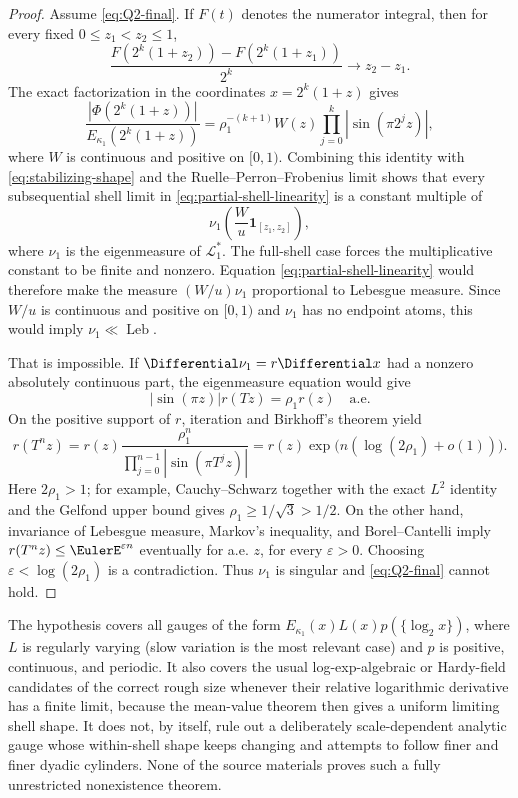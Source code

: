 \documentclass[11pt,oneside]{article}
\theoremstyle{definition}
\theoremstyle{remark}
\begin{document}
\begin{proof}
Assume \eqref{eq:Q2-final}.  If $F(t)$ denotes the numerator integral, then for every fixed
$0\le z_1<z_2\le1$,
\begin{equation}
 \frac{F(2^k(1+z_2))-F(2^k(1+z_1))}{2^k}\longrightarrow z_2-z_1.
 \label{eq:partial-shell-linearity}
\end{equation}
The exact factorization in the coordinates $x=2^k(1+z)$ gives
\[
 \frac{|\Phi(2^k(1+z))|}{E_{\kappa_1}(2^k(1+z))}
 =\rho_1^{-(k+1)}W(z)\prod_{j=0}^{k}|\sin(\pi2^jz)|,
\]
where $W$ is continuous and positive on $[0,1)$.  Combining this identity with
\eqref{eq:stabilizing-shape} and the Ruelle--Perron--Frobenius limit shows that every
subsequential shell limit in \eqref{eq:partial-shell-linearity} is a constant multiple of
\[
 \nu_1\!\left(\frac{W}{u}\mathbf1_{[z_1,z_2]}\right),
\]
where $\nu_1$ is the eigenmeasure of $\mathcal L_1^*$.  The full-shell case forces the
multiplicative constant to be finite and nonzero.  Equation
\eqref{eq:partial-shell-linearity} would therefore make the measure
$(W/u)\nu_1$ proportional to Lebesgue measure.  Since $W/u$ is continuous and positive on
$[0,1)$ and $\nu_1$ has no endpoint atoms, this would imply $\nu_1\ll\operatorname{Leb}$.

That is impossible.  If $\Differential\nu_1=r\Differential x$ had a nonzero absolutely continuous part, the
eigenmeasure equation would give
\begin{equation}
 |\sin(\pi z)|r(Tz)=\rho_1r(z)
 \quad\text{a.e.}
 \label{eq:conformal-density-final}
\end{equation}
On the positive support of $r$, iteration and Birkhoff's theorem yield
\[
 r(T^nz)=r(z)\frac{\rho_1^n}
 {\prod_{j=0}^{n-1}|\sin(\pi T^jz)|}
 =r(z)\exp\bigl(n(\log(2\rho_1)+o(1))\bigr).
\]
Here $2\rho_1>1$; for example, Cauchy--Schwarz together with the exact $L^2$ identity and
the Gelfond upper bound gives $\rho_1\ge1/\sqrt3>1/2$.  On the other hand, invariance of
Lebesgue measure, Markov's inequality, and Borel--Cantelli imply
$r(T^nz)\le\EulerE^{\varepsilon n}$ eventually for a.e. $z$, for every $\varepsilon>0$.
Choosing $\varepsilon<\log(2\rho_1)$ is a contradiction.  Thus $\nu_1$ is singular and
\eqref{eq:Q2-final} cannot hold.
\end{proof}

The hypothesis covers all gauges of the form
$E_{\kappa_1}(x)L(x)p(\{\log_2x\})$, where $L$ is regularly varying (slow variation is the
most relevant case) and $p$ is positive, continuous, and periodic.  It also covers the
usual log-exp-algebraic or Hardy-field candidates of the correct rough size whenever their
relative logarithmic derivative has a finite limit, because the mean-value theorem then
gives a uniform limiting shell shape.  It does not, by itself, rule out a deliberately
scale-dependent analytic gauge whose within-shell shape keeps changing and attempts to
follow finer and finer dyadic cylinders.  None of the
source materials proves such a fully unrestricted nonexistence theorem.
\end{document}
